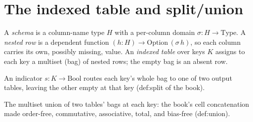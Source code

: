 %
%
%
%

\chapter{The indexed table and split/union}

\begin{definition}
  \label{def:table}\leanok
  A \emph{schema} is a column-name type $H$ with a per-column domain
  $\sigma : H \to \mathrm{Type}$.  A \emph{nested row} is a dependent
  function $(h : H) \to \mathrm{Option}\,(\sigma\,h)$, so each column
  carries its own, possibly missing, value.  An \emph{indexed table} over
  keys $K$ assigns to each key a multiset (bag) of nested rows; the empty
  bag is an absent row.
\end{definition}

\begin{definition}[Split]
  \label{def:split}\leanok
  An indicator $s : K \to \mathrm{Bool}$ routes each key's whole bag to
  one of two output tables, leaving the other empty at that key
  (def:split of the book).
\end{definition}

\begin{definition}[Bind]
  \label{def:union}\leanok
  The multiset union of two tables' bags at each key: the book's cell
  concatenation made order-free, commutative, associative, total, and
  bias-free (def:union).
\end{definition}

